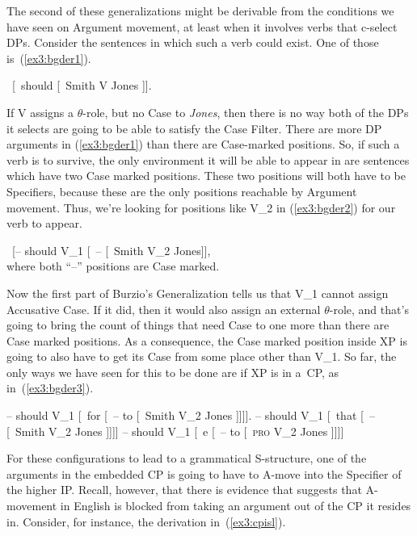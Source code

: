 The second of these generalizations might be derivable from the conditions we have seen on Argument movement, at least when it involves verbs that c-select DPs. Consider the sentences in which such a verb could exist. One of those is~(\ref{ex3:bgder1}). 
\begin{exe}
	\ex \label{ex3:bgder1} \ [\IP\ should [\VP\  Smith V Jones ]].
\end{exe}
If V assigns a $\theta$-role, but no Case to \emph{Jones}, then there is no way both of the DPs it selects are going to be able to satisfy the Case Filter. There are more DP arguments in (\ref{ex3:bgder1}) than there are Case-marked positions. So, if such a verb is to survive, the only environment it will be able to appear in are sentences which have two Case marked positions. These two positions will both have to be Specifiers, because these are the only positions reachable by Argument movement. Thus, we're looking for positions like V_2 in (\ref{ex3:bgder2}) for our verb to appear.
\begin{exe}
	\ex \label{ex3:bgder2} \ [\IP -- should V_1 [\XP\ -- [\VP\ Smith V_2 Jones]],\\
								 where both ``--'' positions are Case marked.
\end{exe}
Now the first part of Burzio's Generalization tells us that V_1 cannot assign Accusative Case. If it did, then it would also assign an external {$\theta$-role}, and that's going to bring the count of things that need Case to one more than there are Case marked positions. As a consequence, the Case marked position inside XP is going to also have to get its Case from some place other than V_1. So far, the only ways we have seen for this to be done are if XP is in a~CP, as in~(\ref{ex3:bgder3}).
\pagebreak
\begin{exe}
	\ex \label{ex3:bgder3}
	\begin{xlist}
	\sn {[\IP} -- should V_1 [\CP\ for [\IP\ -- to [\VP\ Smith V_2 Jones ]]]].
	\sn {[\IP} -- should V_1 [\CP\ that [\IP\ --  [\VP\ Smith V_2 Jones ]]]]
	\sn {[\IP} -- should V_1 [\CP\ e [\IP\ -- to [\VP\ \textsc{pro} V_2 Jones ]]]]
\end{xlist}	
\end{exe}
For these configurations to lead to a grammatical S-structure, one of the arguments in the embedded CP is going to have to A-move into the Specifier of the higher IP. Recall, however, that there is evidence that suggests that A-movement in English is blocked from taking an argument out of the CP it resides in. Consider, for instance, the derivation in~(\ref{ex3:cpisl}).

